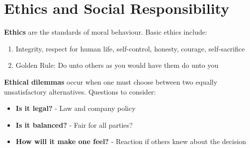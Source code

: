 \documentclass[english, 12pt]{article}
\begin{document}
\section{Ethics and Social Responsibility}
\begin{defn}
\textbf{Ethics} are the standards of moral behaviour. Basic ethics include:
\begin{enumerate}
\item Integrity, respect for human life, self-control, honesty, courage, self-sacrifice
\item Golden Rule: Do unto others as you would have them do unto you
\end{enumerate}
\end{defn}
\begin{defn}
\textbf{Ethical dilemmas} occur when one must choose between two equally unsatisfactory alternatives. Questions to consider:
\begin{itemize}
\item \textbf{Is it legal?} - Law and company policy
\item \textbf{Is it balanced?} - Fair for all parties?
\item \textbf{How will it make one feel?} - Reaction if others knew about the decision
\end{itemize}
\end{defn}
\end{document}
